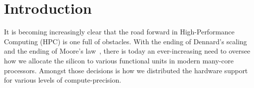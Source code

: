 \section{Introduction}\label{sec:intro}


It is becoming increasingly clear that the road forward in High-Performance Computing (HPC) is one full of obstacles.
With the ending of Dennard's scaling~\cite{dennard_design_1974} and the ending of Moore's law~\cite{moore_lithography_1995},
there is today an ever-increasing need to oversee how we allocate the silicon to various functional units in modern many-core
processors. Amongst those decisions is how we distributed the hardware support for various levels of compute-precision.

